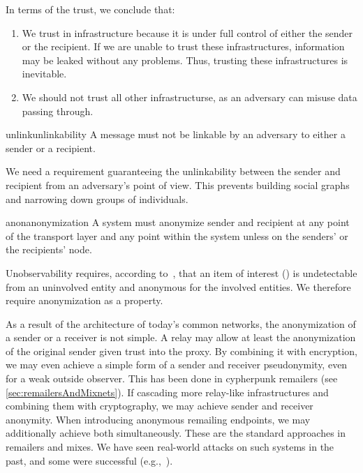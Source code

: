 In terms of the trust, we conclude that:
\begin{enumerate}
	\item We trust in infrastructure because it is under full control of either the sender or the recipient. If we are unable to trust these infrastructures, information may be leaked without any problems. Thus, trusting these infrastructures is inevitable.
	\item We should not trust all other infrastructurse, as an adversary can misuse data passing through.
\end{enumerate}

\begin{requirement}{unlink}{unlinkability}
	A message must not be linkable by an adversary to either a sender or a recipient.
\end{requirement}

We need a requirement guaranteeing the unlinkability between the sender and recipient from an adversary's point of view. This prevents building social graphs and narrowing down groups of individuals.

\begin{requirement}{anon}{anonymization}
	A system must anonymize sender and recipient at any point of the transport layer and any point within the system unless on the senders' or the recipients' node.
\end{requirement}

Unobservability requires, according to~\cite{anonTerminology}, that an item of interest () is undetectable from an uninvolved entity and anonymous for the involved entities. We therefore require anonymization as a property.

As a result of the architecture of today's common networks, the anonymization of a sender or a receiver is not simple. A relay may allow at least the anonymization of the original sender given trust into the proxy. %
By combining it with encryption, we may even achieve a simple form of a sender and receiver pseudonymity, even for a weak outside observer. This has been done in cypherpunk remailers (see \cref{sec:remailersAndMixnets}). If cascading more relay-like infrastructures and combining them with cryptography, we may achieve sender and receiver anonymity. When introducing anonymous remailing endpoints, we may additionally achieve both simultaneously. These are the standard approaches in remailers and mixes. We have seen real-world attacks on such systems in the past, and some were successful (e.g.,~\cite{penetClosure}). 

